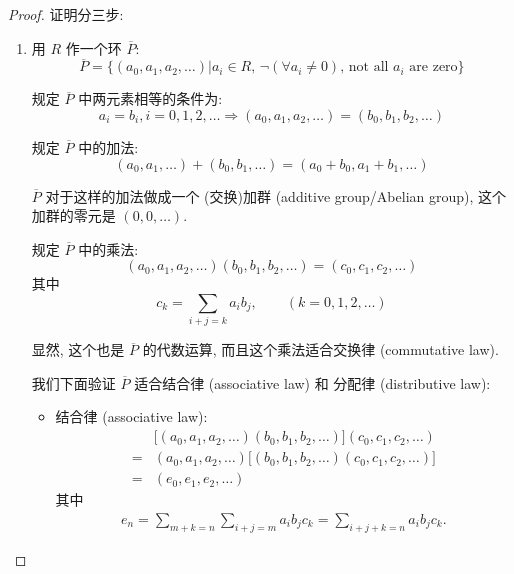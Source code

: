 \documentclass[utf8]{ctexbook}
\theoremstyle{definition}
\begin{document}
\begin{proof}
证明分三步:
\begin{enumerate}
\item{用 $R$ 作一个环 $\overline{P}$: 
\begin{equation}
\overline{P} = \{ (a_0, a_1, a_2, \ldots) | a_i \in R, \, \lnot (\forall a_i \neq 0), \, \mbox{not all $a_i$ are zero}  \} \nonumber
\end{equation}

规定 $\overline{P}$ 中两元素相等的条件为:
\begin{equation}
a_i = b_i , i = 0, 1, 2, \ldots \Longrightarrow (a_0, a_1, a_2, \ldots ) = (b_0, b_1, b_2, \ldots ) \nonumber
\end{equation}

规定 $\overline{P}$ 中的加法:
\begin{equation}
(a_0, a_1, \ldots ) + (b_0, b_1, \ldots ) = (a_0 + b_0 , a_1 + b_1, \ldots ) \nonumber
\end{equation}

$\overline{P}$ 对于这样的加法做成一个 (交换)加群 (additive group/Abelian group), 这个加群的零元是 $(0,0,\ldots)$.

规定 $\overline{P}$ 中的乘法:
\begin{equation}
(a_0, a_1, a_2, \ldots ) (b_0, b_1, b_2, \ldots ) = (c_0, c_1, c_2, \ldots) \nonumber
\end{equation}
其中
\begin{equation}
c_k = \sum_{i+j = k} a_i b_j ,\quad \quad (k=0,1,2, \ldots) \nonumber
\end{equation}

显然, 这个也是 $\overline{P}$ 的代数运算, 而且这个乘法适合交换律 (commutative law).

我们下面验证 $\overline{P}$ 适合结合律 (associative law) 和 分配律 (distributive law):
\begin{itemize}
\item{结合律 (associative law): 
\begin{align*}
& \big[(a_0, a_1, a_2, \ldots)(b_0, b_1, b_2, \ldots)\big](c_0, c_1, c_2, \ldots) \\
= & (a_0, a_1, a_2, \ldots)\big[(b_0, b_1, b_2, \ldots)(c_0, c_1, c_2, \ldots)\big] \\
= & (e_0, e_1, e_2, \ldots)
\end{align*}
其中
\begin{align*}
e_n = \sum_{m+k = n} \sum_{i+j=m} a_i b_j c_k = \sum_{i+j+k=n} a_i b_j c_k .
\end{align*}

}
\end{itemize}}
\end{enumerate}
\end{proof}
\end{document}
